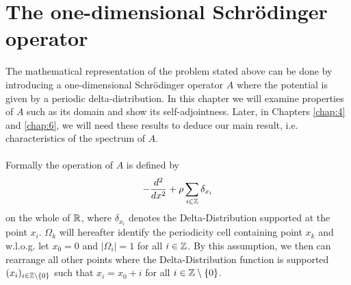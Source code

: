 \chapter{The one-dimensional Schrödinger operator} \label{chap:3}

The mathematical representation of the problem stated above can be done by introducing a one-dimensional Schrödinger operator $A$ where the potential is given by a periodic delta-distribution. In this chapter we will examine properties of $A$ such as its domain and show its self-adjointness. Later, in Chapters \ref{chap:4} and \ref{chap:6}, we will need these results to deduce our main result, i.e. characteristics of the spectrum of $A$. ~\\ ~\\
Formally the operation of $A$ is defined by
\begin{equation}
	- \frac{d^{2}}{dx^{2}} + \rho \sum_{i \in \mathbb{Z}} \delta_{x_{i}} \label{the-operator-A-formally}
\end{equation}
on the whole of $\mathbb{R}$, where $\delta_{x_{i}}$ denotes the Delta-Distribution supported at the point $x_{i}$. $\Omega_{k}$ will hereafter identify the periodicity cell containing point $x_{k}$ and w.l.o.g. let $x_{0} = 0$ and $|\Omega_{i}| = 1$ for all $i \in \mathbb{Z}$. By this assumption, we then can rearrange all other points where the Delta-Distribution function is supported $(x_{i})_{i \in \mathbb{Z} \setminus \{0\}}$ such that $x_{i} = x_{0} + i$ for all $i \in \mathbb{Z} \setminus \{0\}$. 
~\\  

